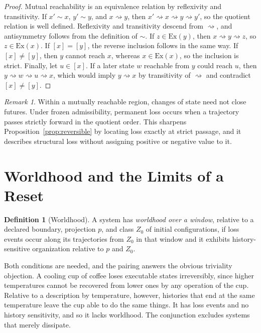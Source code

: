 \documentclass[11pt]{article}
\theoremstyle{definition}
\newtheorem{definition}{Definition}
\theoremstyle{plain}
\theoremstyle{remark}
\newtheorem*{remark}{Remark}
\newcommand{\reaches}{\rightsquigarrow}
\begin{document}
\begin{proof}
Mutual reachability is an equivalence relation by reflexivity and transitivity. If $x' \sim x$, $y' \sim y$, and $x \reaches y$, then $x' \reaches x \reaches y \reaches y'$, so the quotient relation is well defined. Reflexivity and transitivity descend from $\reaches$, and antisymmetry follows from the definition of $\sim$. If $z \in \mathrm{Ex}(y)$, then $x \reaches y \reaches z$, so $z \in \mathrm{Ex}(x)$. If $[x] = [y]$, the reverse inclusion follows in the same way. If $[x] \neq [y]$, then $y$ cannot reach $x$, whereas $x \in \mathrm{Ex}(x)$, so the inclusion is strict. Finally, let $u \in [x]$. If a later state $w$ reachable from $y$ could reach $u$, then $y \reaches w \reaches u \reaches x$, which would imply $y \reaches x$ by transitivity of $\reaches$ and contradict $[x] \neq [y]$.
\end{proof}

\begin{remark}
Within a mutually reachable region, changes of state need not close futures. Under frozen admissibility, permanent loss occurs when a trajectory passes strictly forward in the quotient order. This sharpens Proposition~\ref{prop:reversible} by locating loss exactly at strict passage, and it describes structural loss without assigning positive or negative value to it.
\end{remark}

\section{Worldhood and the Limits of a Reset}

\begin{definition}[Worldhood]
A system has \emph{worldhood over a window}, relative to a declared boundary, projection $p$, and class $Z_0$ of initial configurations, if loss events occur along its trajectories from $Z_0$ in that window and it exhibits history-sensitive organization relative to $p$ and $Z_0$.
\end{definition}

Both conditions are needed, and the pairing answers the obvious triviality objection. A cooling cup of coffee loses executable states irreversibly, since higher temperatures cannot be recovered from lower ones by any operation of the cup. Relative to a description by temperature, however, histories that end at the same temperature leave the cup able to do the same things. It has loss events and no history sensitivity, and so it lacks worldhood. The conjunction excludes systems that merely dissipate.
\end{document}
